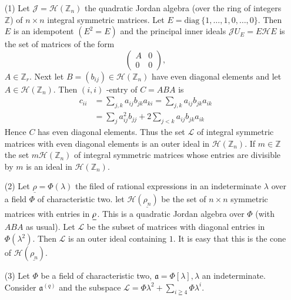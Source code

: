 \begin{examples*}
\begin{itemize}
\item[(1)] Let $\mathscr{J}=\mathscr{H}(\mathbb{Z}_n)$ the quadratic
  Jordan algebra (over the ring of integers $\mathbb{Z}$) of $n\times
  n$ integral symmetric matrices. Let
  $E=\text{diag}~ \{1,\ldots,1,0,\ldots,0\}$. Then $E$ is an idempotent
  $(E^{2}=E)$ and the principal inner ideals
  $\mathscr{J}U_E=E\mathscr{H} E$ is the set of matrices of the
  form\pageoriginale 
  $$
  \begin{pmatrix}
    A & 0\\
    0 & 0
  \end{pmatrix},
  $$
  $A\in \mathbb{Z}_r$. Next let $B=(b_{ij})\in
  \mathscr{H}(\mathbb{Z}_n)$ have even diagonal elements and let $A\in
  \mathscr{H}(\mathbb{Z}_n)$. Then $(i,i)$ -entry of $C=ABA$ is  
  \begin{align*}
    c_{ii}&=\sum_{j,k}a_{ij}b_{jk} a_{ki}=\sum_{j,k} a_{ij}b_{jk}a_{ik}\\
    &=\sum_{j}a^{2}_{ij}b_{jj}+2\sum_{j<k}a_{ij}b_{jk}a_{ik}
  \end{align*}
  Hence $C$ has even diagonal elements. Thus the set $\mathscr{L}$ of
  integral symmetric matrices with even diagonal elements is an outer
  ideal in $\mathscr{H}(\mathbb{Z}_n)$. If $m\in \mathbb{Z}$ the set
  $m\mathscr{H}(\mathbb{Z}_n)$ of integral symmetric matrices whose
  entries are divisible by $m$ is an ideal in
  $\mathscr{H}(\mathbb{Z}_n)$. 

\item[(2)]  Let $\underline{\rho}=\Phi(\lambda)$ the filed of rational
  expressions in an indeterminate $\lambda$ over a field $\Phi$ of
  characteristic two. let $\mathscr{H} \underline{(\rho_{n})}$ be the
  set of $n\times n$ symmetric matrices with entries in
  $\underline{\rho}$. This is a quadratic Jordan algebra over $\Phi$
  (with $ABA$ as usual). Let $\mathscr{L}$ be the
  subset of matrices with diagonal entries in
  $\Phi(\lambda^{2})$. Then $\mathscr{L}$ is an outer ideal containing
  $1$. It is easy that this is the cone of
  $\mathscr{H}(\underline{\rho_{n}})$. 

\item[(3)] Let $\Phi$ be a field of characteristic two,
  $\mathfrak{a}=\Phi[\lambda],\lambda$ an indeterminate. Consider
  $\mathfrak{a}^{(q)}$  and the subspace
  $\mathscr{L}=\Phi\lambda^{2}+\sum\limits_{i\geqq 4}\Phi
  \lambda^{i}$. 


\end{itemize}
\end{examples*}

